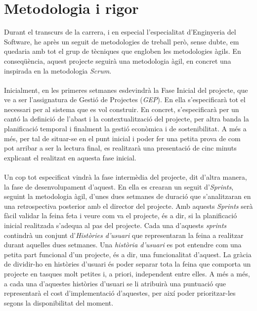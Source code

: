 
\section{Metodologia i rigor}

Durant el transcurs de la carrera, i en especial l'especialitat d'Enginyeria del Software, he après un seguit de metodologies de treball però, sense dubte, em quedaria amb tot el grup de tècniques que engloben les metodologies àgils. En conseqüència, aquest projecte seguirà una metodologia àgil, en concret una inspirada en la metodologia \textit{Scrum}.
\\\\
Inicialment, en les primeres setmanes esdevindrà la Fase Inicial del projecte, que ve a ser l'assignatura de Gestió de Projectes (\textit{GEP}). En ella s'especificarà tot el necessari per al sistema que es vol construir. En concret, s'especificarà per un cantó la definició de l'abast i la contextualització del projecte, per altra banda la planificació temporal i finalment la gestió econòmica i de sostenibilitat. A més a més, per tal de situar-se en el punt inicial i poder fer una petita prova de com pot arribar a ser la lectura final, es realitzarà una presentació de cinc minuts explicant el realitzat en aquesta fase inicial.
\\\\
Un cop tot especificat vindrà la fase intermèdia del projecte, dit d'altra manera, la fase de desenvolupament d'aquest. En ella es crearan un seguit d'\textit{Sprints}, seguint la metodologia àgil, d'unes dues setmanes de duració que s'analitzaran en una retrospectiva posterior amb el director del projecte. Amb aquests \textit{Sprints} serà fàcil validar la feina feta i veure com va el projecte, és a dir, si la planificació inicial realitzada s'adequa al pas del projecte. Cada una d'aquests \textit{sprints} contindrà un conjunt d'\textit{Històries d'usuari} que representaran la feina a realitzar durant aquelles dues setmanes. Una \textit{història d'usuari} es pot entendre com una petita part funcional d'un projecte, és a dir, una funcionalitat d'aquest. La gràcia de dividir-ho en històries d'usuari és poder separar tota la feina que comporta un projecte en tasques molt petites i, a priori, independent entre elles. A més a més, a cada una d'aquestes històries d'usuari se li atribuirà una puntuació que representarà el cost d'implementació d'aquestes, per així poder prioritzar-les segons la disponibilitat del moment.

